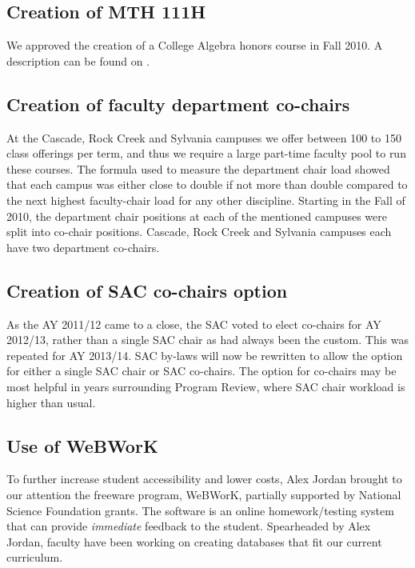   \subsection{Creation of MTH 111H} We approved the creation of a College Algebra honors
    course in Fall 2010.   A description can be found on .
  \subsection{Creation of faculty department co-chairs} At the Cascade, Rock Creek and Sylvania campuses we
    offer between 100 to 150 class offerings per term, and
    thus we require a large part-time faculty pool to run these courses.    The
    formula used to measure the department chair load showed that each campus
    was either close to double if not more than double compared to the next
    highest faculty-chair load for any other discipline.   Starting in the Fall
    of 2010, the department chair positions at each of the mentioned campuses
    were split into co-chair positions.   Cascade, Rock Creek and Sylvania
    campuses each have two department co-chairs.
  \subsection{Creation of SAC co-chairs option} As the AY 2011/12 came to a close, the SAC voted to elect 
    co-chairs for AY 2012/13, rather than a single SAC chair as had always been the custom.
    This was repeated for AY 2013/14. SAC by-laws will now be rewritten to allow the option for either
    a single SAC chair or SAC co-chairs. The option for co-chairs may be most helpful in years surrounding
    Program Review, where SAC chair workload is higher than usual.
  \subsection{Use of WeBWorK} To further increase student accessibility and lower costs,
Alex Jordan brought to our attention the freeware program,
    WeBWorK,  partially supported by  National Science Foundation grants.    The
    software is an online homework/testing
    system that can provide \emph{immediate} feedback to the student.   Spearheaded by Alex
    Jordan, faculty have been working on creating databases that fit our current
    curriculum. 
    
